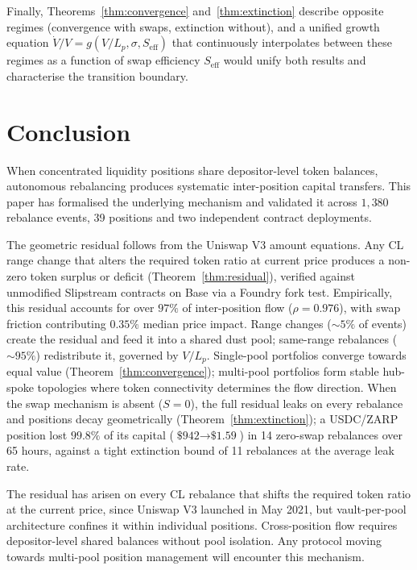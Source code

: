 \documentclass[11pt,a4paper]{article}
\begin{document}
Finally, Theorems~\ref{thm:convergence} and~\ref{thm:extinction} describe opposite regimes (convergence with swaps, extinction without), and a unified growth equation $\dot{V}/V = g(V/L_p, \sigma, S_{\text{eff}})$ that continuously interpolates between these regimes as a function of swap efficiency $S_{\text{eff}}$ would unify both results and characterise the transition boundary.

\section{Conclusion}\label{sec:conclusion}

When concentrated liquidity positions share depositor-level token balances, autonomous rebalancing produces systematic inter-position capital transfers. This paper has formalised the underlying mechanism and validated it across $1{,}380$ rebalance events, 39 positions and two independent contract deployments.

The geometric residual follows from the Uniswap V3 amount equations. Any CL range change that alters the required token ratio at current price produces a non-zero token surplus or deficit (Theorem~\ref{thm:residual}), verified against unmodified Slipstream contracts on Base via a Foundry fork test. Empirically, this residual accounts for over $97\%$ of inter-position flow ($\rho = 0.976$), with swap friction contributing $0.35\%$ median price impact. Range changes (${\sim}5\%$ of events) create the residual and feed it into a shared dust pool; same-range rebalances (${\sim}95\%$) redistribute it, governed by $V/L_p$. Single-pool portfolios converge towards equal value (Theorem~\ref{thm:convergence}); multi-pool portfolios form stable hub-spoke topologies where token connectivity determines the flow direction. When the swap mechanism is absent ($S = 0$), the full residual leaks on every rebalance and positions decay geometrically (Theorem~\ref{thm:extinction}); a USDC/ZARP position lost $99.8\%$ of its capital ($\text{\$942} \to \text{\$1.59}$) in 14 zero-swap rebalances over 65 hours, against a tight extinction bound of 11 rebalances at the average leak rate.

The residual has arisen on every CL rebalance that shifts the required token ratio at the current price, since Uniswap V3 launched in May 2021, but vault-per-pool architecture confines it within individual positions. Cross-position flow requires depositor-level shared balances without pool isolation. Any protocol moving towards multi-pool position management will encounter this mechanism.
\end{document}
